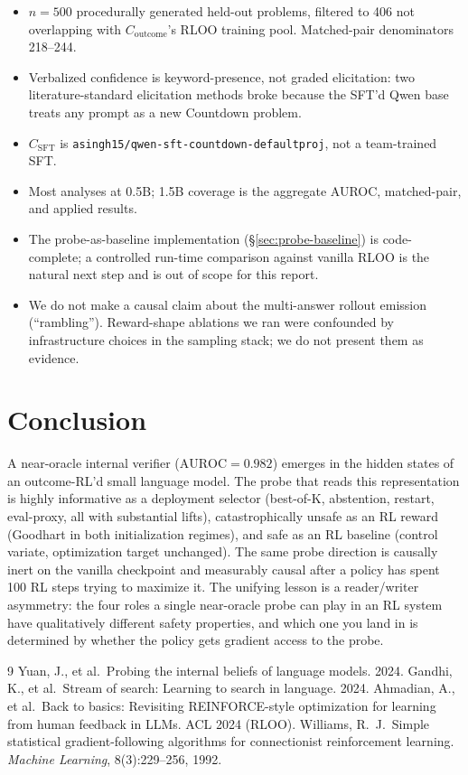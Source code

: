 \documentclass[11pt]{article}
\begin{document}
\begin{itemize}[leftmargin=2em,itemsep=1pt,topsep=2pt]
  \item $n{=}500$ procedurally generated held-out problems, filtered to 406 not overlapping with $C_{\text{outcome}}$'s RLOO training pool. Matched-pair denominators 218--244.
  \item Verbalized confidence is keyword-presence, not graded elicitation: two literature-standard elicitation methods broke because the SFT'd Qwen base treats any prompt as a new Countdown problem.
  \item $C_{\text{SFT}}$ is \texttt{asingh15/qwen-sft-countdown-defaultproj}, not a team-trained SFT.
  \item Most analyses at 0.5B; 1.5B coverage is the aggregate AUROC, matched-pair, and applied results.
  \item The probe-as-baseline implementation (\S\ref{sec:probe-baseline}) is code-complete; a controlled run-time comparison against vanilla RLOO is the natural next step and is out of scope for this report.
  \item We do not make a causal claim about the multi-answer rollout emission (``rambling''). Reward-shape ablations we ran were confounded by infrastructure choices in the sampling stack; we do not present them as evidence.
\end{itemize}

\section{Conclusion}

A near-oracle internal verifier ($\text{AUROC}=0.982$) emerges in the hidden states of an outcome-RL'd small language model. The probe that reads this representation is highly informative as a deployment selector (best-of-K, abstention, restart, eval-proxy, all with substantial lifts), catastrophically unsafe as an RL reward (Goodhart in both initialization regimes), and safe as an RL baseline (control variate, optimization target unchanged). The same probe direction is causally inert on the vanilla checkpoint and measurably causal after a policy has spent 100 RL steps trying to maximize it. The unifying lesson is a reader/writer asymmetry: the four roles a single near-oracle probe can play in an RL system have qualitatively different safety properties, and which one you land in is determined by whether the policy gets gradient access to the probe.


\begin{thebibliography}{9}
 Yuan, J., et al.\ Probing the internal beliefs of language models. 2024.
 Gandhi, K., et al.\ Stream of search: Learning to search in language. 2024.
 Ahmadian, A., et al.\ Back to basics: Revisiting REINFORCE-style optimization for learning from human feedback in LLMs. ACL 2024 (RLOO).
 Williams, R.\ J.\ Simple statistical gradient-following algorithms for connectionist reinforcement learning. \emph{Machine Learning}, 8(3):229--256, 1992.
\end{thebibliography}
\end{document}

